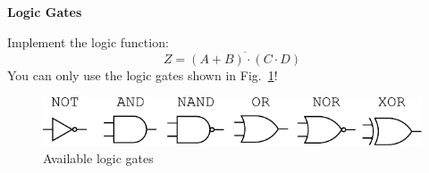 \question[3]
%
\textbf{Logic Gates}

Implement the logic function: $$Z=\overline{(A+B)\cdot(C\cdot D)}$$ You can only
use the logic gates shown in Fig.~\ref{fig:gates}!

\begin{figure}[h]
	\centering
		\includegraphics{img/gates.pdf}
	\caption{Available logic gates}
	\label{fig:gates}
\end{figure}

